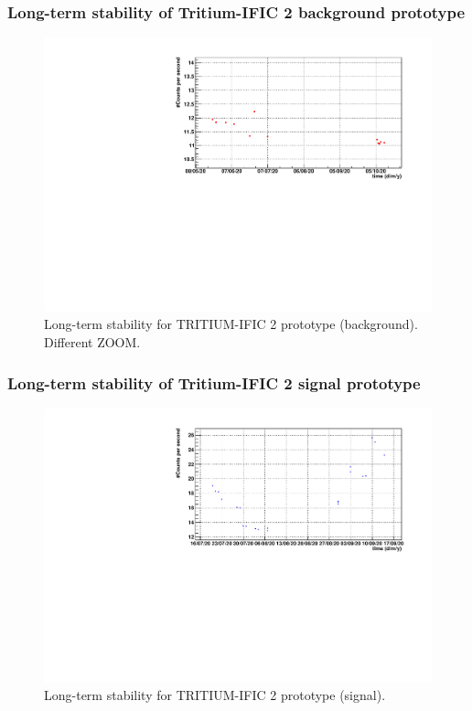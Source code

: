\documentclass{beamer}
\begin{document}
\begin{frame}
\frametitle{Long-term stability of Tritium-IFIC 2 background prototype}

\begin{figure}[hbtp]
\centering
\includegraphics[scale=0.6]{Imagenes/3Long-term_Stability/Monitorizacion_Fondo_rojo_Zoom2.pdf}
\caption{Long-term stability for TRITIUM-IFIC 2 prototype (background). Different ZOOM.}
\end{figure}

\end{frame}

\begin{frame}
\frametitle{Long-term stability of Tritium-IFIC 2 signal prototype}

\begin{figure}[hbtp]
\centering
\includegraphics[scale=0.6]{Imagenes/3Long-term_Stability/Monitorizacion_senyal_azul.pdf}
\caption{Long-term stability for TRITIUM-IFIC 2 prototype (signal).}
\end{figure}

\end{frame}
\end{document}

